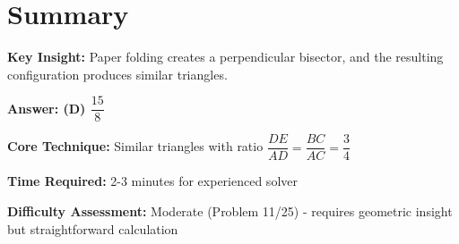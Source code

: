 \documentclass[12pt]{article}
\begin{document}
\section*{Summary}

\textbf{Key Insight:} Paper folding creates a perpendicular bisector, and the resulting configuration produces similar triangles.

\textbf{Answer: (D) $\dfrac{15}{8}$}

\textbf{Core Technique:} Similar triangles with ratio $\dfrac{DE}{AD} = \dfrac{BC}{AC} = \dfrac{3}{4}$

\textbf{Time Required:} 2-3 minutes for experienced solver

\textbf{Difficulty Assessment:} Moderate (Problem 11/25) - requires geometric insight but straightforward calculation
\end{document}
